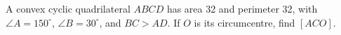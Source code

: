 A convex cyclic quadrilateral $ ABCD $ has area 32 and perimeter 32, with $\angle A=150^\circ $, $\angle B=30^\circ $, and $ BC>AD $. If $ O $ is its circumcentre, find $[ACO]$.
